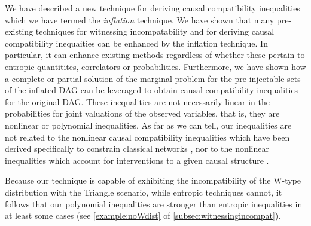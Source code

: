 We have described a new technique for deriving causal compatibility inequalities which we have termed the {\em inflation} technique.  
We have shown that many pre-existing techniques for witnessing incompatability and for deriving causal compatibility inequaities can be enhanced by the inflation technique.  In particular, it can enhance existing methods regardless of whether these pertain to entropic quantitites, correlators or probabilities.  Furthermore, we have shown how a complete or partial solution of the marginal problem for the pre-injectable sets of the inflated DAG can be leveraged to obtain causal compatibility inequalities  for the original DAG.  These inequalities are not necessarily linear in the probabilities for joint valuations of the observed variables, that is, they are nonlinear or polynomial inequalities.  As far as we can tell, our inequalities are not related to the nonlinear causal compatibility inequalities which have been derived specifically to constrain classical networks \cite{TavakoliStarNetworks,RossetNetworks,TavakoliNoncyclicNetworks}, nor to the nonlinear inequalities which account for interventions to a given causal structure \cite{kang2007polynomialconstraints,steeg2011relaxation}.

Because our technique is capable of exhibiting the incompatibility of the W-type distribution with the Triangle scenario, while entropic techniques cannot, it follows that our polynomial inequalities are stronger than entropic inequalities in at least some cases (see \cref{example:noWdist} of \cref{subsec:witnessingincompat}).   

